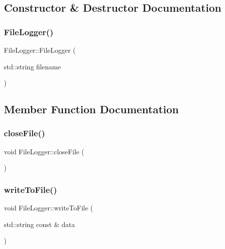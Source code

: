 \subsection{Constructor \& Destructor Documentation}
\mbox{\label{class_file_logger_a7e1527826890498c11dd2f09c6c04c7e}} 
\subsubsection{\texorpdfstring{File\+Logger()}{FileLogger()}}
{\footnotesize\ttfamily File\+Logger\+::\+File\+Logger (\begin{DoxyParamCaption}\item[{std\+::string}]{filename }\end{DoxyParamCaption})}



\subsection{Member Function Documentation}
\mbox{\label{class_file_logger_a615be6cc97dec3ad38a085b063669f8e}} 
\subsubsection{\texorpdfstring{close\+File()}{closeFile()}}
{\footnotesize\ttfamily void File\+Logger\+::close\+File (\begin{DoxyParamCaption}{ }\end{DoxyParamCaption})}

\mbox{\label{class_file_logger_a5bb4f335d8d25b52ba2799d8b73ba037}} 
\subsubsection{\texorpdfstring{write\+To\+File()}{writeToFile()}}
{\footnotesize\ttfamily void File\+Logger\+::write\+To\+File (\begin{DoxyParamCaption}\item[{std\+::string const \&}]{data }\end{DoxyParamCaption})}




